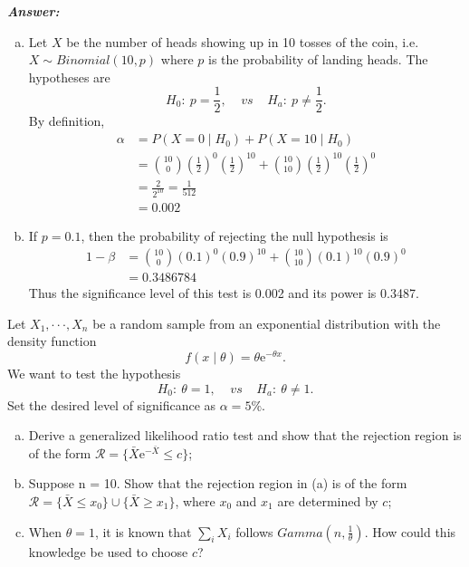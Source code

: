 \documentclass[12pt]{article}
\newenvironment{question}[2][Question]{\begin{trivlist}
\item[\hskip \labelsep {\bfseries #1}\hskip \labelsep {\bfseries #2.}]}{\end{trivlist}}
\begin{document}
  \textbf{\color{TealBlue}\emph{Answer:} } 
 \begin{enumerate}[(a)]  
\item Let $X$ be the number of heads showing up in 10 tosses of the coin, i.e. $X \sim Binomial(10, p)$ where $p$ is the probability of landing heads. The hypotheses are
$$ 
H_0: \ p = \frac{1}{2}, \; \; \; \; vs  \; \; \; \; H_a: \ p  \neq \frac{1}{2}.
$$
By definition,
\begin{align*}
\alpha &= P (X = 0 \mid H_0) + P (X = 10 \mid H_0) \\
&= {10 \choose 0} \left(\frac{1}{2}\right)^0 \left(\frac{1}{2}\right)^{10} +  {10 \choose 10} \left(\frac{1}{2}\right)^{10} \left(\frac{1}{2}\right)^{0}\\
&= \frac{2}{2^{10}}  = \frac{1}{512}\\
&= 0.002
\end{align*}

\item If $p = 0.1$, then the probability of rejecting the null hypothesis is
\begin{align*}
1 - \beta &= {10 \choose 0} (0.1)^0 (0.9)^{10} +  {10 \choose 10} (0.1)^{10} (0.9)^{0}\\
&= 0.3486784
\end{align*}
Thus the significance level of this test is 0.002 and its power is 0.3487.
\end{enumerate}
\bigskip
\bigskip
 \begin{question}{6.2}  Let $X_1, · · · ,X_n$ be a random sample from an exponential distribution with the density function
$$
f(x \mid \theta) = \theta \mathrm{e}^{-\theta x}.
$$
We want to test the hypothesis
$$
H_0: \ \theta = 1, \; \; \; \; vs  \; \; \; \; H_a: \ \theta \neq 1.
$$
Set the desired level of significance as $\alpha = 5\%$.

\begin{enumerate}[(a)]
\item Derive a generalized likelihood ratio test and show that the rejection region is of the form $\mathcal{R} = \{\bar X \mathrm{e}^{-\bar X} \leq c\}$;
\item Suppose n = 10. Show that the rejection region in (a) is of the form $\mathcal{R} = \{\bar X \leq x_0 \} \cup \{\bar X \geq x_1 \}$, where $x_0$ and $x_1$ are determined by $c$;
\item When $\theta = 1$, it is known that $\sum_i X_i$ follows $Gamma(n, \frac{1}{\theta})$. How could this knowledge be
used to choose $c$?
\end{enumerate}

\end{question} 
\end{document}
